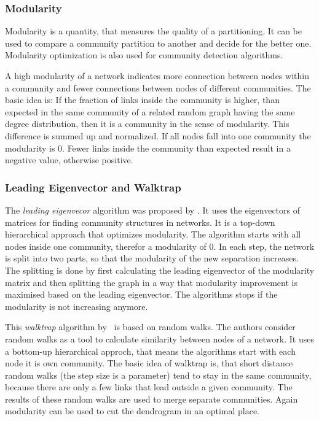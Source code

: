 \subsubsection{Modularity}
Modularity is a quantity, that measures the quality of a partitioning. It can be used to compare a community partition to another and decide for the better one. Modularity optimization is also used for community detection algorithms.

A high modularity of a network indicates more connection between nodes within a community and fewer connections between nodes of different communities. The basic idea is: If the fraction of links inside the community is higher, than expected in the same community of a related random graph having the same degree distribution, then it is a community in the sense of modularity. This difference is summed up and normalized. If all nodes fall into one community the modularity is $0$. Fewer links inside the community than expected result in a negative value, otherwise positive.


\subsubsection{Leading Eigenvector and Walktrap}
The \emph{leading eigenvecor} algorithm was proposed by \textcite{newman2006finding}. It uses the eigenvectors of matrices for finding community structures in networks. It is a top-down hierarchical approach that optimizes modularity. The algorithm starts with all nodes inside one community, therefor a modularity of 0. In each step, the network is split into two parts, so that the modularity of the new separation increases. The splitting is done by first calculating the leading eigenvector of the modularity matrix and then splitting the graph in a way that modularity improvement is maximised based on the leading eigenvector. The algorithms stops if the modularity is not increasing anymore.

This \emph{walktrap} algorithm by~\textcite{pons2005computing} is based on random walks. The authors consider random walks as a tool to calculate similarity between nodes of a network. It uses a bottom-up hierarchical approch, that means the algorithms start with each node it is own community. The basic idea of walktrap is, that short distance random walks (the step size is a parameter) tend to stay in the same community, because there are only a few links that lead outside a given community.
The results of these random walks are used to merge separate communities.
Again modularity can be used to cut the dendrogram in an optimal place.